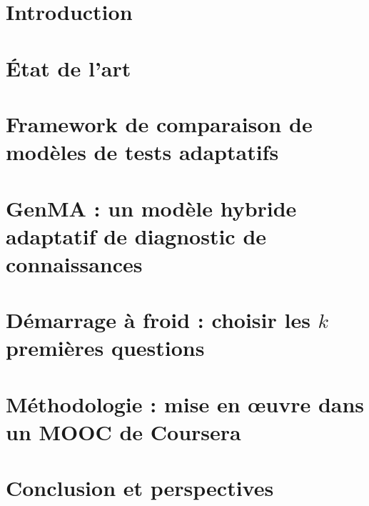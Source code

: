 \documentclass[a4paper,14pt,draft]{memoir}
\begin{document}
\tableofcontents

\chapter{Introduction}


\chapter{État de l'art}


\chapter{Framework de comparaison de modèles de tests adaptatifs}


\chapter{GenMA : un modèle hybride adaptatif de diagnostic de connaissances}



\chapter{Démarrage à froid : choisir les $k$ premières questions}



\chapter{Méthodologie : mise en œuvre dans un MOOC de Coursera}


\chapter{Conclusion et perspectives}
\end{document}
